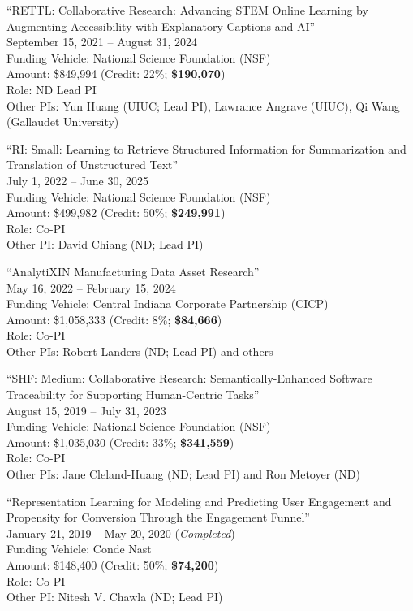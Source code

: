 \documentclass[10pt]{article}
\newenvironment{myindentpar}[1]%
{\begin{list}{}%
         {\setlength{\leftmargin}{#1}}%
         \item[]%
}
{\end{list}}
\newcounter{list}
\begin{document}
\begin{myindentpar}{0.75cm}
\hspace{-0.75cm}``RETTL: Collaborative Research: Advancing STEM Online Learning by Augmenting Accessibility with Explanatory Captions and AI'' \\
September 15, 2021 -- August 31, 2024 \\
Funding Vehicle: National Science Foundation (NSF) \\
Amount: \$849,994 (Credit: 22\%; \textbf{\$190,070}) \\
Role: {ND Lead PI} \\
Other PIs: Yun Huang (UIUC; Lead PI), Lawrance Angrave (UIUC), Qi Wang (Gallaudet University)

\hspace{-0.75cm}``RI: Small: Learning to Retrieve Structured Information for Summarization and Translation of Unstructured Text'' \\
July 1, 2022 -- June 30, 2025 \\
Funding Vehicle: National Science Foundation (NSF) \\
Amount: \$499,982 (Credit: 50\%; \textbf{\$249,991}) \\
Role: {Co-PI} \\
Other PI: David Chiang (ND; Lead PI)

\hspace{-0.75cm}``AnalytiXIN Manufacturing Data Asset Research'' \\
May 16, 2022 -- February 15, 2024 \\
Funding Vehicle: Central Indiana Corporate Partnership (CICP) \\
Amount: \$1,058,333 (Credit: 8\%; \textbf{\$84,666}) \\
Role: {Co-PI} \\
Other PIs: Robert Landers (ND; Lead PI) and others

\hspace{-0.75cm}``SHF: Medium: Collaborative Research: Semantically-Enhanced Software Traceability for Supporting Human-Centric Tasks'' \\
August 15, 2019 -- July 31, 2023 \\
Funding Vehicle: National Science Foundation (NSF) \\
Amount: \$1,035,030 (Credit: 33\%; \textbf{\$341,559}) \\
Role: {Co-PI} \\
Other PIs: Jane Cleland-Huang (ND; Lead PI) and Ron Metoyer (ND)

\hspace{-0.75cm}``Representation Learning for Modeling and Predicting User Engagement and Propensity for Conversion Through the Engagement Funnel'' \\
January 21, 2019 -- May 20, 2020 (\emph{Completed}) \\
Funding Vehicle: Conde Nast \\
Amount: \$148,400 (Credit: 50\%; \textbf{\$74,200}) \\
Role: {Co-PI} \\
Other PI: Nitesh V. Chawla (ND; Lead PI)


\end{myindentpar}
\end{document}
